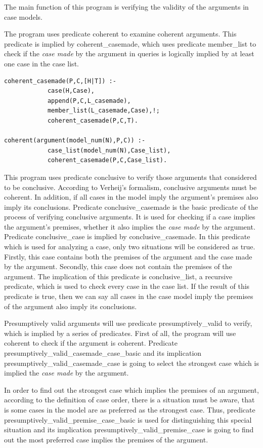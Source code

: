 \documentclass{IOS-Book-Article}
\begin{document}
The main function of this program is verifying the validity of the arguments in case models. 

The program uses predicate {\mf coherent} to examine coherent arguments. This predicate is implied by {\mf coherent\_casemade}, which uses predicate {\mf member\_list} to check if the \textit{case made} by the argument in queries is logically implied by at least one case in the case list.
\begin{lstlisting}
coherent_casemade(P,C,[H|T]) :-
			case(H,Case),
			append(P,C,L_casemade),
			member_list(L_casemade,Case),!;
			coherent_casemade(P,C,T).

coherent(argument(model_num(N),P,C)) :-
			case_list(model_num(N),Case_list),
			coherent_casemade(P,C,Case_list).
\end{lstlisting}

This program uses predicate {\mf conclusive} to verify those arguments that considered to be conclusive. According to Verheij's formalism, conclusive arguments must be coherent. In addition, if all cases in the model imply the argument's premises also imply its conclusions. Predicate {\mf conclusive\_casemade} is the basic predicate of the process of verifying conclusive arguments. It is used for checking if a case implies the argument's premises, whether it also implies the \textit{case made} by the argument. Predicate {\mf conclusive\_case} is implied by {\mf conclusive\_casemade}. In this predicate which is used for analyzing a case, only two situations will be considered as {\mf true}. Firstly, this case contains both the premises of the argument and the case made by the argument. Secondly, this case does not contain the premises of the argument. The implication of this predicate is {\mf conclusive\_list}, a recursive predicate, which is used to check every case in the case list. If the result of this predicate is {\mf true}, then we can say all cases in the case model imply the premises of the argument also imply its conclusions.

Presumptively valid arguments will use predicate {\mf presumptively\_valid} to verify, which is implied by a series of predicates. First of all, the program will use {\mf coherent} to check if the argument is coherent. Predicate {\mf presumptively\_valid\_casemade\_case\_basic} and its implication {\mf presumptively\_valid\_casemade\_case} is going to select the strongest case which is implied the \textit{case made} by the argument. 

In order to find out the strongest case which implies the premises of an argument, according to the definition of case order, there is a situation must be aware, that is some cases in the model are as preferred as the strongest case. Thus, predicate {\mf presumptively\_valid\_premise\_case\_basic} is used for distinguishing this special situation and its implication {\mf presumptively\_valid\_premise\_case} is going to find out the most preferred case implies the premises of the argument. 
\end{document}
